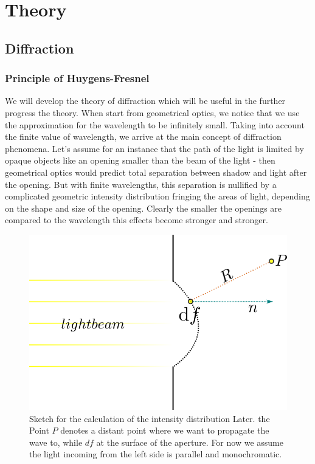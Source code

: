 \section{Theory}
\subsection{Diffraction}
\subsubsection{Principle of Huygens-Fresnel} 
We will develop the theory of diffraction \cite{landau2} which will be useful in the further progress
the theory. When start from geometrical optics, we notice that we use the approximation for the 
wavelength to be infinitely small. Taking into account the finite value of wavelength, we arrive at the
main concept of diffraction phenomena. Let's assume for an instance that the path of the light is limited by
opaque objects like an opening smaller than the beam of the light - then geometrical optics would predict 
total separation between shadow and light after the opening. But with finite wavelengths, this separation
is nullified by a complicated geometric intensity distribution fringing the areas of light,
depending on the shape and size of the opening. Clearly the smaller the openings are compared to the
wavelength this effects become stronger and stronger.
\begin{figure}[htpb]
    \centering
    \includegraphics[width=0.5\linewidth]{figures/beam}
    \caption{Sketch for the calculation of the intensity distribution Later. the Point $P$ denotes a distant
        point where we want to propagate the wave to, while $df$ at the surface of the aperture. For now 
        we assume the light incoming from the left side is parallel and monochromatic.}
    \label{fig:beam}
\end{figure}

